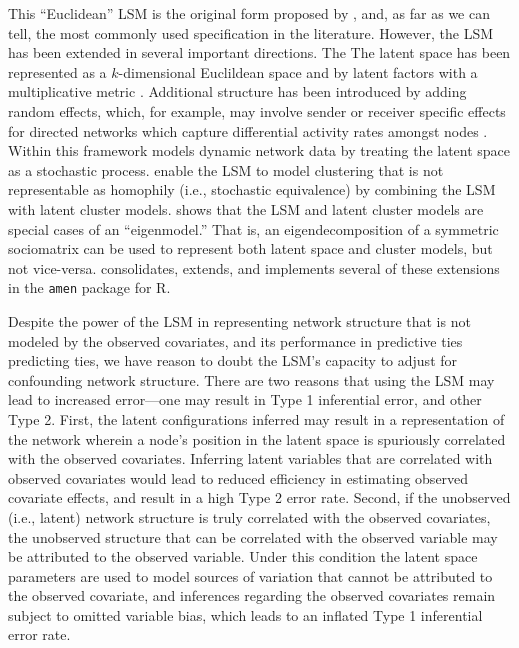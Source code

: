 \documentclass[11pt]{article}
\newcommand{\R}{\textsf{R}\space} %
\begin{document}
This ``Euclidean'' LSM is the original form proposed by \citet{hoff2002latent}, and, as far as we can tell, the most commonly used specification in the literature. However, the LSM has been extended in several important directions. The  The latent space has been represented as a $k$-dimensional Euclildean space and by latent factors with a multiplicative metric \citep{hoff2002latent, hoff2004modeling, hoff_2005_jasa, hoff2009multiplicative}. Additional structure has been introduced by adding random effects, which, for example, may involve sender or receiver specific effects for directed networks which capture differential activity rates amongst nodes \citep{hoff2003random}. Within this framework \cite{westveld2011mixed} models dynamic network data by treating the latent space as a stochastic process. \cite{handcock2007model} enable the LSM to model clustering that is not representable as homophily (i.e., stochastic equivalence) by combining the LSM with latent cluster models. \cite{hoff2008modeling} shows that the LSM and latent cluster models are special cases of an ``eigenmodel.'' That is, an eigendecomposition of a symmetric sociomatrix can be used to represent both latent space and cluster models, but not vice-versa. \citet{hoff2015dyadic} consolidates, extends, and implements several of these extensions in the \texttt{amen} package \citep{amen} for \R. 


Despite the power of the LSM in representing network structure that is not modeled by the observed covariates, and its performance in predictive ties predicting ties, we have reason to doubt the LSM's capacity to adjust for confounding network structure. There are two reasons that using the LSM may lead to increased error---one may result in Type 1 inferential error, and other Type 2. First, the latent configurations inferred may result in a representation of the network wherein a node's position in the latent space is spuriously correlated with the observed covariates. Inferring latent variables that are correlated with observed covariates would lead to reduced efficiency in estimating observed covariate effects, and result in a high Type 2 error rate.  Second, if the unobserved (i.e., latent) network structure is truly correlated with the observed covariates, the unobserved structure that can be correlated with the observed variable may be attributed to the observed variable. Under this condition the latent space parameters are used to model sources of variation that cannot be attributed to the observed covariate, and inferences regarding the observed covariates remain subject to omitted variable bias, which leads to an inflated Type 1 inferential error rate. 
\end{document}
